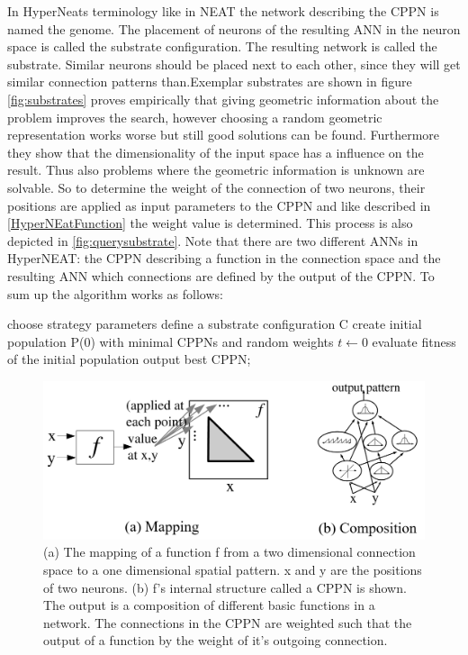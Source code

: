 In HyperNeats terminology like in NEAT the network describing the CPPN is named the genome. The placement of neurons of the resulting ANN in the neuron space is called the substrate configuration. The resulting network is called the substrate. Similar neurons should be placed next to each other, since they will get similar connection patterns than.Exemplar substrates are shown in figure \ref{fig:substrates} \cite{GeometrySensitvityHyperneat}  proves empirically  that giving geometric information about the problem improves the search, however choosing a random geometric representation works worse but still good solutions can be found. Furthermore they show that the dimensionality of the input space has a influence on the result.  Thus also problems where the geometric information is unknown are solvable.  So to determine the weight of the connection of two neurons, their positions are applied as input parameters to the CPPN and like described in \ref{HyperNEatFunction} the weight value is determined. This process is also depicted in \ref{fig:querysubstrate}. Note that there are two different ANNs in HyperNEAT: the CPPN describing a function in the connection space and the resulting ANN which connections are defined by the output of the CPPN. 
To sum up the algorithm works as follows:

\begin{algorithm}[h!] %
	\label{HyberNEATAlgorithm}
	choose strategy parameters\;
	define a substrate configuration C \;
	create initial population P(0) with minimal CPPNs and random weights\;
	$t \gets 0$\;
	evaluate fitness of the initial population\;
	output best CPPN;
\end{algorithm}

\begin{figure}[tb]
	\centering
	\includegraphics[width=0.7\linewidth]{figures/HyperNeat/CPPN}
	\caption[Exemplar CPPN]{(a) The mapping of a function f from a two dimensional connection space to a one dimensional spatial pattern. x and y are the positions of two neurons. (b) f's internal structure called a CPPN is shown. The output is a composition of different basic functions in a network. The connections in the CPPN are weighted such that the output of a function by the weight of it's outgoing connection. \cite[p. 5]{HyperNEAT}}
	\label{fig:cppn}
\end{figure}

